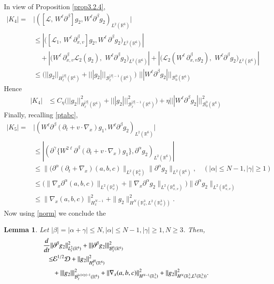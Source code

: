 \documentclass{amsart}[12pt, article]
\newtheorem{lemm}[theo]{Lemma}
\begin{document}
In view of Proposition \ref{prop3.2.4},
\begin{align*}
|K_4|=&\big |([\mathcal{L},\, W^\ell{{\partial}}^\beta]g_2, W^\ell{{\partial}}^\beta g_2)_{L^2({{{\mathbb R}}}^6)}\big |
\\&\le
\left|\Big([{{\mathcal L}}_1,\, W^\ell \,\partial^\beta_{x, v}] g_2,W^\ell
\,\partial^\beta
g_2)_{L^2({{{\mathbb R}}}^6)}\right|
\\&\quad+
\left|\Big(W^\ell \,\partial^\beta_{x, v} {{\mathcal L}}_2(g_2),\,\,
W^\ell{{\partial}}^\beta g_2\Big)_{L^2({{{\mathbb R}}}^6)}\right|+
\left|\Big( {{\mathcal L}}_2(W^\ell \,\partial^\beta_{x, v}g_2),\,\,
W^\ell{{\partial}}^\beta g_2\Big)_{L^2({{{\mathbb R}}}^6)}\right|
\\&\le
\Big( ||
g_2||_{H^{|\beta|}_\ell({{{\mathbb R}}}^6)}+ |||
g_2|||_{{{\mathcal B}}^{|\beta|-1}_\ell({{{\mathbb R}}}^6)}\, \Big)\,\, |||
W^\ell{{\partial}}^\beta g_2|||_{{{\mathcal B}}^0_0({{{\mathbb R}}}^6)}
\end{align*}
Hence
\begin{align*}
|K_4|&\le C_\eta \Big(||g_2||_{H^{|\beta|}_\ell({{{\mathbb R}}}^6)}^2+
|||g_2|||_{{{\mathcal B}}^{|\beta|-1}_\ell({{{\mathbb R}}}^6)}^2\Big)+
\eta|||W^\ell{{\partial}}^\beta g_2|||^2_{{{\mathcal B}}^0_0({{{\mathbb R}}}^6)}
\end{align*}
Finally, recalling \eqref{ptabc},
\begin{align*}
|K_5|=&\big |(W^\ell{{\partial}}^\beta ({{\partial}}_t+v\cdot\nabla_x )g_1,W^\ell{{\partial}}^\beta g_2)_{L^2({{{\mathbb R}}}^6)}\big|
\\&
\le |({{\partial}}^\gamma \Big\{W^{2\ell}{{\partial}}^\beta ({{\partial}}_t+v\cdot\nabla_x )g_1\Big\},
{{\partial}}^\alpha g_2)_{L^2({{{\mathbb R}}}^6)}|
\\&
\le\|({{\partial}}^\alpha({{\partial}}_t  +\nabla_x)(a,b,c)\|_{L^2({{{\mathbb R}}}^3_x)}
\|{{\partial}}^\alpha g_2\|_{L^2({{{\mathbb R}}}^6)},\quad (|\alpha|\le N-1,|\gamma|\ge 1)
\\&
\le\Big(
\|\nabla_x{{\partial}}^\alpha (a,b,c)\|_{L^2({{{\mathbb R}}}^3_x)}+\|\nabla_x{{\partial}}^\alpha g_2\|_{L^2({{{\mathbb R}}}^6_{x, v})}\Big)
\|{{\partial}}^\alpha  g_2\|_{L^2({{{\mathbb R}}}^6_{x, v})}
\\&\le
\|\nabla_x (a,b,c)\|_{H^{N-1}_x}^2
+\|g_2\|_{H^N({{{\mathbb R}}}^3_x, L^2({{{\mathbb R}}}^3_v))}^2.
\end{align*}
Now using \eqref{norm} we conclude the
\begin{lemm}
Let $|\beta|=|\alpha+\gamma|\le N, |\alpha|\le N-1, |\gamma|\ge 1, N\ge 3$. Then,
\begin{align}\label{microenergy4}
 \frac{d}{dt}\|& {{\partial}}^\beta g_2\|^2_{L^2_\ell({{{\mathbb R}}}^6)}+||| {{\partial}}^\beta g_2 |||^2_{{{\mathcal B}}^{0}_\ell({{{\mathbb R}}}^6)}
\\ \le&\notag
\mathcal{E}^{1/2}\mathcal{D}+||g_2||_{H^{|\beta|}_\ell({{{\mathbb R}}}^6)}^2
\\&+\notag
||| g_2|||_{{{\mathcal B}}^{|\alpha|+|\gamma|-1}_\ell({{{\mathbb R}}}^6)}^2+\|\nabla_x (a,b,c)\|_{H^{N-1}({{{\mathbb R}}}^3_x)}^2
+\|g_2\|_{H^N({{{\mathbb R}}}^3_x, L^2({{{\mathbb R}}}^3_v))}^2.
 \end{align}
\end{lemm}
\end{document}
